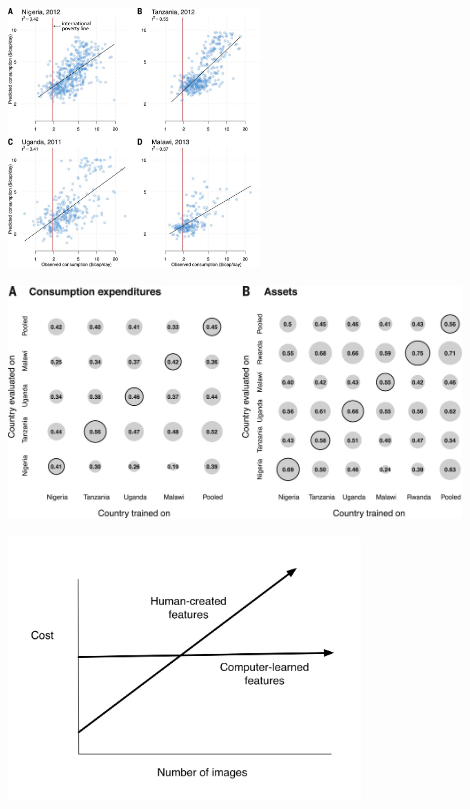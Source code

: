 \documentclass[aspectratio=169]{beamer}
\begin{document}
\begin{frame}

\begin{center}
\includegraphics[width=0.5\textwidth]{figures/jean_combining_2016_fig3}
\end{center}

\end{frame}
\begin{frame}

\begin{center}
\includegraphics[width=0.9\textwidth]{figures/jean_combining_2016_fig5}
\end{center}

\end{frame}
\begin{frame}

\begin{center}
\includegraphics[width=0.7\textwidth]{figures/zero_variable_cost_features}
\end{center}

\end{frame}
\end{document}
